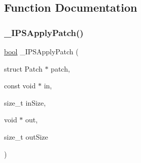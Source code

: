 \subsection{Function Documentation}
\mbox{\label{patch-ips_8c_ad571623fdebecb3eb9d9bf7d1c56569e}} 
\subsubsection{\texorpdfstring{\+\_\+\+I\+P\+S\+Apply\+Patch()}{\_IPSApplyPatch()}}
{\footnotesize\ttfamily \mbox{\hyperlink{libretro_8h_a4a26dcae73fb7e1528214a068aca317e}{bool}} \+\_\+\+I\+P\+S\+Apply\+Patch (\begin{DoxyParamCaption}\item[{struct Patch $\ast$}]{patch,  }\item[{const void $\ast$}]{in,  }\item[{size\+\_\+t}]{in\+Size,  }\item[{void $\ast$}]{out,  }\item[{size\+\_\+t}]{out\+Size }\end{DoxyParamCaption})\hspace{0.3cm}{\ttfamily [static]}}


